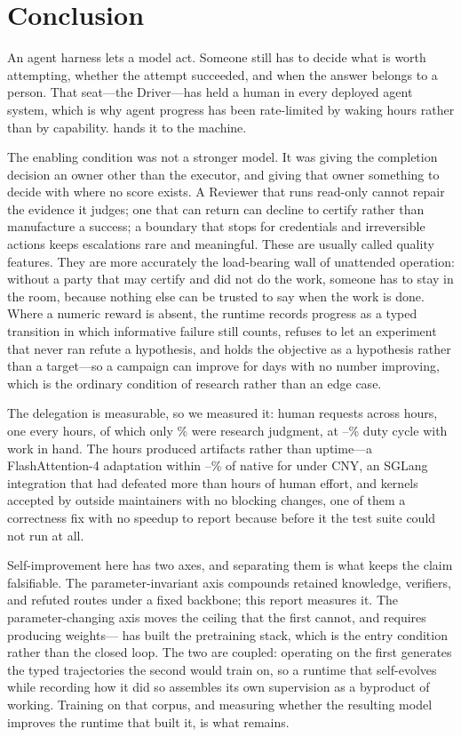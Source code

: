 \section{Conclusion}
\label{sec:conclusion}

An agent harness lets a model act. Someone still has to decide what is worth
attempting, whether the attempt succeeded, and when the answer belongs to a person.
That seat---the Driver---has held a human in every deployed agent system, which is
why agent progress has been rate-limited by waking hours rather than by capability.
\systemname{} hands it to the machine.

The enabling condition was not a stronger model. It was giving the completion
decision an owner other than the executor, and giving that owner something to decide
with where no score exists. A Reviewer that runs read-only cannot repair the evidence
it judges; one that can return  can decline to certify rather than
manufacture a success; a boundary that stops for credentials and irreversible actions
keeps escalations rare and meaningful. These are usually called quality features.
They are more accurately the load-bearing wall of unattended operation: without a
party that may certify and did not do the work, someone has to stay in the room,
because nothing else can be trusted to say when the work is done. Where a numeric reward is absent, the runtime records progress as a
typed transition in which informative failure still counts, refuses to let an
experiment that never ran refute a hypothesis, and holds the objective as a
hypothesis rather than a target---so a campaign can improve for days with no number
improving, which is the ordinary condition of research rather than an edge case.

The delegation is measurable, so we measured it: \DutyInterruptions{} human requests
across \DutyWallHours{} hours, one every \DutyInterval{} hours, of which only
\DutyJudgmentPercent\% were research judgment, at
\DutyCycleLow--\DutyCycleHigh\% duty cycle with work in hand. The hours produced
artifacts rather than uptime---a FlashAttention-4 adaptation within
\FlashDAGapLow--\FlashDAGapHigh\% of native for under \FlashDACostCNY{} CNY, an
SGLang integration that had defeated more than \SGLangHumanHours{} hours of human
effort, and \FLAPRTotal{} kernels accepted by outside maintainers with no blocking
changes, one of them a correctness fix with no speedup to report because before it
the test suite could not run at all.

Self-improvement here has two axes, and separating them is what keeps the claim
falsifiable. The parameter-invariant axis compounds retained knowledge, verifiers, and
refuted routes under a fixed backbone; this report measures it. The
parameter-changing axis moves the ceiling that the first cannot, and requires
producing weights---\systemname{} has built the pretraining stack, which is the entry
condition rather than the closed loop. The two are coupled: operating on the first
generates the typed trajectories the second would train on, so a runtime that
self-evolves while recording how it did so assembles its own supervision as a
byproduct of working. Training on that corpus, and measuring whether the resulting
model improves the runtime that built it, is what remains.

